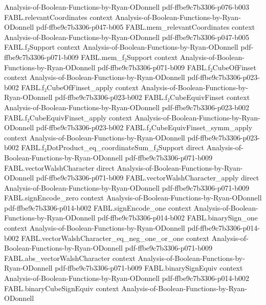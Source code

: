 \begin{theorem}
  {Analysis-of-Boolean-Functions-by-Ryan-ODonnell}
  {pdf-ffbe9c7b3306-p076-b003}
\proofstep
  {FABL.relevantCoordinates}
  {context}
  {Analysis-of-Boolean-Functions-by-Ryan-ODonnell}
  {pdf-ffbe9c7b3306-p047-b005}
\proofstep
  {FABL.mem_relevantCoordinates}
  {context}
  {Analysis-of-Boolean-Functions-by-Ryan-ODonnell}
  {pdf-ffbe9c7b3306-p047-b005}
\proofstep
  {FABL.f₂Support}
  {context}
  {Analysis-of-Boolean-Functions-by-Ryan-ODonnell}
  {pdf-ffbe9c7b3306-p071-b009}
\proofstep
  {FABL.mem_f₂Support}
  {context}
  {Analysis-of-Boolean-Functions-by-Ryan-ODonnell}
  {pdf-ffbe9c7b3306-p071-b009}
\proofstep
  {FABL.f₂CubeOfFinset}
  {context}
  {Analysis-of-Boolean-Functions-by-Ryan-ODonnell}
  {pdf-ffbe9c7b3306-p023-b002}
\proofstep
  {FABL.f₂CubeOfFinset_apply}
  {context}
  {Analysis-of-Boolean-Functions-by-Ryan-ODonnell}
  {pdf-ffbe9c7b3306-p023-b002}
\proofstep
  {FABL.f₂CubeEquivFinset}
  {context}
  {Analysis-of-Boolean-Functions-by-Ryan-ODonnell}
  {pdf-ffbe9c7b3306-p023-b002}
\proofstep
  {FABL.f₂CubeEquivFinset_apply}
  {context}
  {Analysis-of-Boolean-Functions-by-Ryan-ODonnell}
  {pdf-ffbe9c7b3306-p023-b002}
\proofstep
  {FABL.f₂CubeEquivFinset_symm_apply}
  {context}
  {Analysis-of-Boolean-Functions-by-Ryan-ODonnell}
  {pdf-ffbe9c7b3306-p023-b002}
\proofstep
  {FABL.f₂DotProduct_eq_coordinateSum_f₂Support}
  {direct}
  {Analysis-of-Boolean-Functions-by-Ryan-ODonnell}
  {pdf-ffbe9c7b3306-p071-b009}
\proofstep
  {FABL.vectorWalshCharacter}
  {direct}
  {Analysis-of-Boolean-Functions-by-Ryan-ODonnell}
  {pdf-ffbe9c7b3306-p071-b009}
\proofstep
  {FABL.vectorWalshCharacter_apply}
  {direct}
  {Analysis-of-Boolean-Functions-by-Ryan-ODonnell}
  {pdf-ffbe9c7b3306-p071-b009}
\proofstep
  {FABL.signEncode_zero}
  {context}
  {Analysis-of-Boolean-Functions-by-Ryan-ODonnell}
  {pdf-ffbe9c7b3306-p014-b002}
\proofstep
  {FABL.signEncode_one}
  {context}
  {Analysis-of-Boolean-Functions-by-Ryan-ODonnell}
  {pdf-ffbe9c7b3306-p014-b002}
\proofstep
  {FABL.binarySign_one}
  {context}
  {Analysis-of-Boolean-Functions-by-Ryan-ODonnell}
  {pdf-ffbe9c7b3306-p014-b002}
\proofstep
  {FABL.vectorWalshCharacter_eq_neg_one_or_one}
  {context}
  {Analysis-of-Boolean-Functions-by-Ryan-ODonnell}
  {pdf-ffbe9c7b3306-p071-b009}
\proofstep
  {FABL.abs_vectorWalshCharacter}
  {context}
  {Analysis-of-Boolean-Functions-by-Ryan-ODonnell}
  {pdf-ffbe9c7b3306-p071-b009}
\proofstep
  {FABL.binarySignEquiv}
  {context}
  {Analysis-of-Boolean-Functions-by-Ryan-ODonnell}
  {pdf-ffbe9c7b3306-p014-b002}
\proofstep
  {FABL.binaryCubeSignEquiv}
  {context}
  {Analysis-of-Boolean-Functions-by-Ryan-ODonnell}

\end{theorem}
